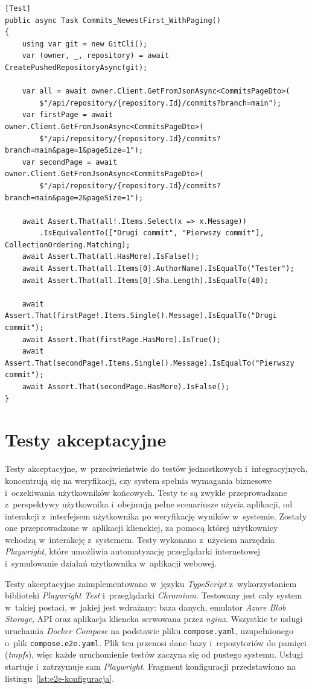 \begin{lstlisting}[basicstyle=\footnotesize\ttfamily, captionpos=t, caption={Test historii commitów i~stronicowania}, label={lst:it-commity}]
[Test]
public async Task Commits_NewestFirst_WithPaging()
{
    using var git = new GitCli();
    var (owner, _, repository) = await CreatePushedRepositoryAsync(git);

    var all = await owner.Client.GetFromJsonAsync<CommitsPageDto>(
        $"/api/repository/{repository.Id}/commits?branch=main");
    var firstPage = await owner.Client.GetFromJsonAsync<CommitsPageDto>(
        $"/api/repository/{repository.Id}/commits?branch=main&page=1&pageSize=1");
    var secondPage = await owner.Client.GetFromJsonAsync<CommitsPageDto>(
        $"/api/repository/{repository.Id}/commits?branch=main&page=2&pageSize=1");

    await Assert.That(all!.Items.Select(x => x.Message))
        .IsEquivalentTo(["Drugi commit", "Pierwszy commit"], CollectionOrdering.Matching);
    await Assert.That(all.HasMore).IsFalse();
    await Assert.That(all.Items[0].AuthorName).IsEqualTo("Tester");
    await Assert.That(all.Items[0].Sha.Length).IsEqualTo(40);

    await Assert.That(firstPage!.Items.Single().Message).IsEqualTo("Drugi commit");
    await Assert.That(firstPage.HasMore).IsTrue();
    await Assert.That(secondPage!.Items.Single().Message).IsEqualTo("Pierwszy commit");
    await Assert.That(secondPage.HasMore).IsFalse();
}
\end{lstlisting}

\section{Testy akceptacyjne}
Testy akceptacyjne, w~przeciwieństwie do testów jednostkowych i~integracyjnych, koncentrują się na weryfikacji, czy system spełnia wymagania biznesowe i~oczekiwania użytkowników końcowych. 
Testy te są zwykle przeprowadzane z~perspektywy użytkownika i~obejmują pełne scenariusze użycia aplikacji, od interakcji z~interfejsem użytkownika po weryfikację wyników w~systemie.
Zostały one przeprowadzone w~aplikacji klienckiej, za pomocą której użytkownicy wchodzą w~interakcję z~systemem.
Testy wykonano z~użyciem narzędzia \textit{Playwright}, które umożliwia automatyzację przeglądarki internetowej i~symulowanie działań użytkownika w~aplikacji webowej.

Testy akceptacyjne zaimplementowano w~języku \textit{TypeScript} z~wykorzystaniem biblioteki \textit{Playwright Test}
i~przeglądarki \textit{Chromium}. Testowany jest cały system w~takiej postaci, w~jakiej jest wdrażany: baza danych,
emulator \textit{Azure Blob Storage}, API oraz aplikacja kliencka serwowana przez \textit{nginx}. Wszystkie te usługi
uruchamia \textit{Docker Compose} na podstawie pliku \texttt{compose.yaml}, uzupełnionego o~plik
\texttt{compose.e2e.yaml}. Plik ten przenosi dane bazy i~repozytoriów do pamięci (\textit{tmpfs}), więc każde
uruchomienie testów zaczyna się od pustego systemu. Usługi startuje i~zatrzymuje sam \textit{Playwright}. Fragment
konfiguracji przedstawiono na listingu~\ref{lst:e2e-konfiguracja}.

